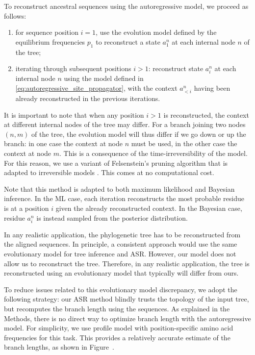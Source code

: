 To reconstruct ancestral sequences using the autoregressive model, we proceed as follows: 
\begin{enumerate}[label=\emph{\roman*}]	
	\item for sequence position $i=1$, use the evolution model defined by the equilibrium frequencies $p_1$ to reconstruct a state $a^n_1$ at each internal node $n$ of the tree;
	\item iterating through subsequent positions $i > 1$: reconstruct state $a^n_i$ at each internal node $n$ using the model defined in \eqref{eq:autoregressive_site_propagator}, with the context $a^n_{<i}$ having been already reconstructed in the previous iterations. 
\end{enumerate}
It is important to note that when any position $i>1$ is reconstructed, the context at different internal nodes of the tree may differ. 
For a branch joining two nodes $(n, m)$ of the tree, the evolution model will thus differ if we go down or up the branch: in one case the context at node $n$ must be used, in the other case the context at node $m$. 
This is a consequence of the time-irreversibility of the model. 
For this reason, we use a variant of Felsenstein's pruning algorithm that is adapted to irreversible models \cite{boussau_efficientlikelihoodcomputations_2006}. 
This comes at no computational cost. 

Note that this method is adapted to both maximum likelihood and Bayesian inference. 
In the ML case, each iteration reconstructs the most probable residue is at a position $i$ given the already reconstructed context. 
In the Bayesian case, residue $a^n_i$ is instead sampled from the posterior distribution. 

In any realistic application, the phylogenetic tree has to be reconstructed from the aligned sequences. 
In principle, a consistent approach would use the same evolutionary model for tree inference and ASR. 
However, our model does not allow us to reconstruct the tree.
Therefore, in any realistic application, the tree is reconstructed using an evolutionary model that typically will differ from ours. 

To reduce issues related to this evolutionary model discrepancy, we adopt the following strategy: our ASR method blindly trusts the topology of the input tree, but recomputes the branch length using the sequences. 
As explained in the Methods, there is no direct way to optimize branch length with the autoregressive model. 
For simplicity, we use profile model with position-specific amino acid frequencies for this task. 
This provides a relatively accurate estimate of the branch lengths, as shown in Figure~.


